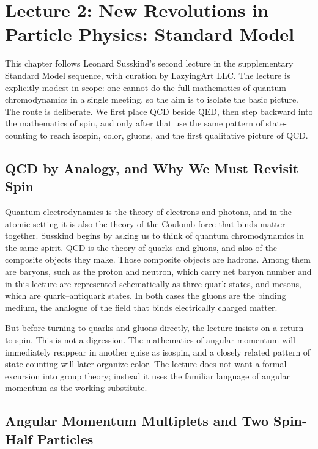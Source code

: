 \chapter{Lecture 2: New Revolutions in Particle Physics: Standard Model}

This chapter follows Leonard Susskind's second lecture in the supplementary Standard Model sequence, with curation by LazyingArt LLC. The lecture is explicitly modest in scope: one cannot do the full mathematics of quantum chromodynamics in a single meeting, so the aim is to isolate the basic picture. The route is deliberate. We first place QCD beside QED, then step backward into the mathematics of spin, and only after that use the same pattern of state-counting to reach isospin, color, gluons, and the first qualitative picture of QCD.

\section{QCD by Analogy, and Why We Must Revisit Spin}

Quantum electrodynamics is the theory of electrons and photons, and in the atomic setting it is also the theory of the Coulomb force that binds matter together. Susskind begins by asking us to think of quantum chromodynamics in the same spirit. QCD is the theory of quarks and gluons, and also of the composite objects they make. Those composite objects are hadrons. Among them are baryons, such as the proton and neutron, which carry net baryon number and in this lecture are represented schematically as three-quark states, and mesons, which are quark--antiquark states. In both cases the gluons are the binding medium, the analogue of the field that binds electrically charged matter.

But before turning to quarks and gluons directly, the lecture insists on a return to spin. This is not a digression. The mathematics of angular momentum will immediately reappear in another guise as isospin, and a closely related pattern of state-counting will later organize color. The lecture does not want a formal excursion into group theory; instead it uses the familiar language of angular momentum as the working substitute.

\section{Angular Momentum Multiplets and Two Spin-Half Particles}

